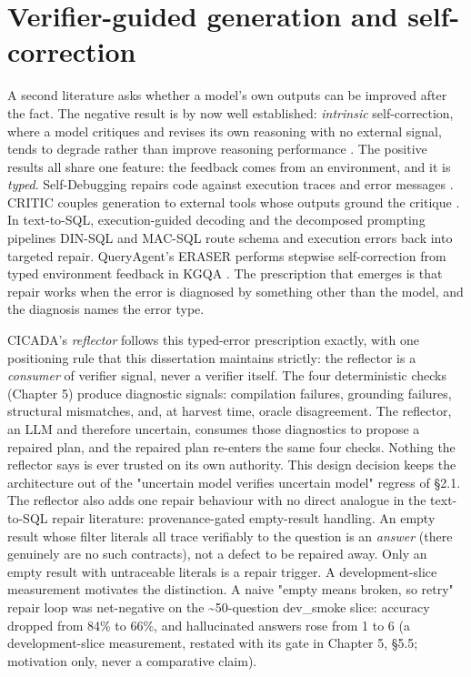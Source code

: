 \documentclass[10pt]{article} %
\begin{document}
\section{Verifier-guided generation and self-correction}\label{sec:verifier-guided-generation-and-self-corr}

A second literature asks whether a model's own outputs can be improved after the fact. The negative result is by now well established: \emph{intrinsic} self-correction, where a model critiques and revises its own reasoning with no external signal, tends to degrade rather than improve reasoning performance \citep{huang2024intrinsic}. The positive results all share one feature: the feedback comes from an environment, and it is \emph{typed}. Self-Debugging repairs code against execution traces and error messages \citep{chen2023selfdebug}. CRITIC couples generation to external tools whose outputs ground the critique \citep{gou2024critic}. In text-to-SQL, execution-guided decoding \citep{wang2018execguided} and the decomposed prompting pipelines DIN-SQL \citep{pourreza2023dinsql} and MAC-SQL \citep{wang2024macsql} route schema and execution errors back into targeted repair. QueryAgent's ERASER performs stepwise self-correction from typed environment feedback in KGQA \citep{huang2024queryagent}. The prescription that emerges is that repair works when the error is diagnosed by something other than the model, and the diagnosis names the error type.

CICADA's \emph{reflector} follows this typed-error prescription exactly, with one positioning rule that this dissertation maintains strictly: the reflector is a \emph{consumer} of verifier signal, never a verifier itself. The four deterministic checks (Chapter 5) produce diagnostic signals: compilation failures, grounding failures, structural mismatches, and, at harvest time, oracle disagreement. The reflector, an LLM and therefore uncertain, consumes those diagnostics to propose a repaired plan, and the repaired plan re-enters the same four checks. Nothing the reflector says is ever trusted on its own authority. This design decision keeps the architecture out of the "uncertain model verifies uncertain model" regress of \S2.1. The reflector also adds one repair behaviour with no direct analogue in the text-to-SQL repair literature: provenance-gated empty-result handling. An empty result whose filter literals all trace verifiably to the question is an \emph{answer} (there genuinely are no such contracts), not a defect to be repaired away. Only an empty result with untraceable literals is a repair trigger. A development-slice measurement motivates the distinction. A naive "empty means broken, so retry" repair loop was net-negative on the \textasciitilde{}50-question dev\_smoke slice: accuracy dropped from 84\% to 66\%, and hallucinated answers rose from 1 to 6 (a development-slice measurement, restated with its gate in Chapter 5, \S5.5; motivation only, never a comparative claim).
\end{document}
